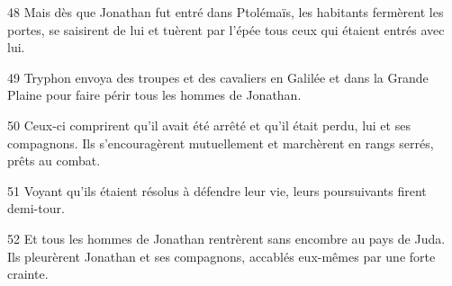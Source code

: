
48 Mais dès que Jonathan fut entré dans Ptolémaïs, les habitants fermèrent les portes, se saisirent de lui et tuèrent par l’épée tous ceux qui étaient entrés avec lui.

49 Tryphon envoya des troupes et des cavaliers en Galilée et dans la Grande Plaine pour faire périr tous les hommes de Jonathan.

50 Ceux-ci comprirent qu’il avait été arrêté et qu’il était perdu, lui et ses compagnons. Ils s’encouragèrent mutuellement et marchèrent en rangs serrés, prêts au combat.

51 Voyant qu’ils étaient résolus à défendre leur vie, leurs poursuivants firent demi-tour.

52 Et tous les hommes de Jonathan rentrèrent sans encombre au pays de Juda. Ils pleurèrent Jonathan et ses compagnons, accablés eux-mêmes par une forte crainte.